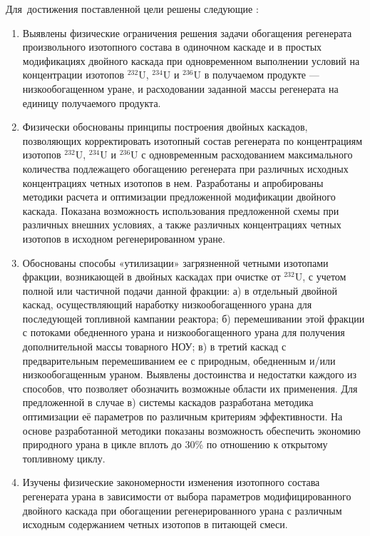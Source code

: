 Для~достижения поставленной цели решены следующие {\tasks}:
\begin{enumerate}
  \item Выявлены физические ограничения решения задачи обогащения регенерата произвольного изотопного состава в одиночном каскаде и в простых модификациях двойного каскада при одновременном выполнении условий на концентрации изотопов $^{232}$U, $^{234}$U и $^{236}$U в получаемом продукте --- низкообогащенном уране, и расходовании заданной массы регенерата на единицу получаемого продукта.
  \item Физически обоснованы принципы построения двойных каскадов, позволяющих корректировать изотопный состав регенерата по концентрациям изотопов $^{232}$U, $^{234}$U и $^{236}$U с одновременным расходованием максимального количества подлежащего обогащению регенерата при различных исходных концентрациях четных изотопов в нем. Разработаны и апробированы методики расчета и оптимизации предложенной модификации двойного каскада. Показана возможность использования предложенной схемы при различных внешних условиях, а также различных концентрациях четных изотопов в исходном регенерированном уране.
  \item Обоснованы способы «утилизации» загрязненной четными изотопами фракции, возникающей в двойных каскадах при очистке от $^{232}$U, с учетом полной или частичной подачи данной фракции: а) в отдельный двойной каскад, осуществляющий наработку низкообогащенного урана для последующей топливной кампании реактора; б) перемешивании этой фракции с потоками обедненного урана и низкообогащенного урана для получения дополнительной массы товарного НОУ; в) в третий каскад с предварительным перемешиванием ее с природным, обедненным и/или низкообогащенным ураном. Выявлены достоинства и недостатки каждого из способов, что позволяет обозначить возможные области их применения. Для предложенной в случае в) системы каскадов разработана методика оптимизации её параметров по различным критериям эффективности. На основе разработанной методики показаны возможность обеспечить экономию природного урана в цикле вплоть до 30\% по отношению к открытому топливному циклу.
  \item Изучены физические закономерности изменения изотопного состава регенерата урана в зависимости от выбора параметров модифицированного двойного каскада при обогащении регенерированного урана с различным исходным содержанием четных изотопов в питающей смеси.
\end{enumerate}

